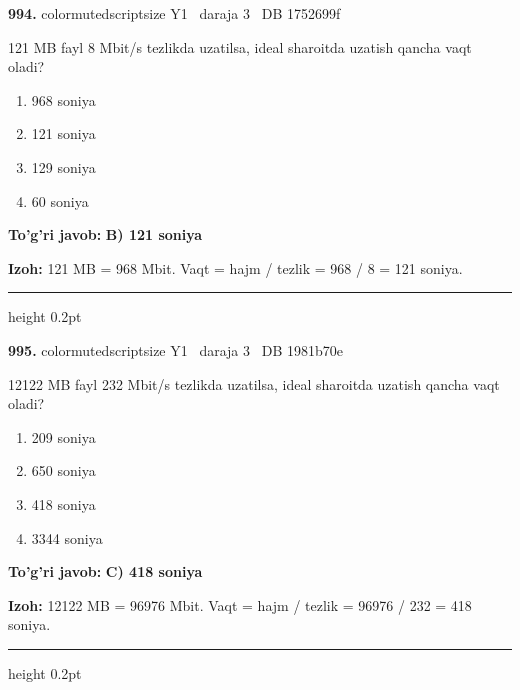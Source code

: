 \documentclass[10pt,a4paper,oneside]{article}
\begin{document}
\noindent\textbf{\color{ink}994.}  {color{muted}scriptsize Y1 \textbullet\ daraja 3 \textbullet\ DB 1752699f}
\par
121 MB fayl 8 Mbit/s tezlikda uzatilsa, ideal sharoitda uzatish qancha vaqt oladi?
\begin{enumerate}[label=\Alph*),leftmargin=9mm]
\item 968 soniya
\item 121 soniya
\item 129 soniya
\item 60 soniya
\end{enumerate}
\begin{tcolorbox}[enhanced,breakable,colback=teal!4,colframe=teal!50!black,boxrule=0.5pt,arc=1.1mm,left=3mm,right=3mm,top=1.7mm,bottom=1.7mm,before skip=2mm,after skip=2mm]
\textbf{\color{teal}To'g'ri javob:} \textbf{B) 121 soniya}
\par\smallskip
\textbf{Izoh:} 121 MB = 968 Mbit. Vaqt = hajm / tezlik = 968 / 8 = 121 soniya.
\end{tcolorbox}
\vspace{2mm}\hrule height 0.2pt \vspace{3mm}

\noindent\textbf{\color{ink}995.}  {color{muted}scriptsize Y1 \textbullet\ daraja 3 \textbullet\ DB 1981b70e}
\par
12122 MB fayl 232 Mbit/s tezlikda uzatilsa, ideal sharoitda uzatish qancha vaqt oladi?
\begin{enumerate}[label=\Alph*),leftmargin=9mm]
\item 209 soniya
\item 650 soniya
\item 418 soniya
\item 3344 soniya
\end{enumerate}
\begin{tcolorbox}[enhanced,breakable,colback=teal!4,colframe=teal!50!black,boxrule=0.5pt,arc=1.1mm,left=3mm,right=3mm,top=1.7mm,bottom=1.7mm,before skip=2mm,after skip=2mm]
\textbf{\color{teal}To'g'ri javob:} \textbf{C) 418 soniya}
\par\smallskip
\textbf{Izoh:} 12122 MB = 96976 Mbit. Vaqt = hajm / tezlik = 96976 / 232 = 418 soniya.
\end{tcolorbox}
\vspace{2mm}\hrule height 0.2pt \vspace{3mm}
\end{document}
